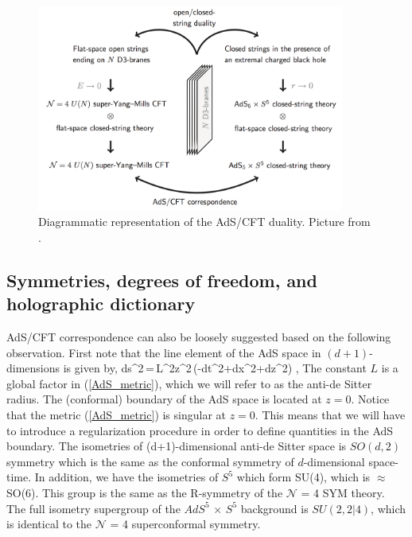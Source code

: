 \begin{figure}[h!]
\label{fig:AdS1} 
  \centering
      \includegraphics[width=0.9\textwidth]{./Figures/ads22.jpg}
  \caption{\label{fig:AdS1}Diagrammatic representation of the AdS/CFT duality. Picture from \cite{ZEA}.}
\end{figure}



\subsection{Symmetries, degrees of freedom, and holographic dictionary} 

AdS/CFT correspondence can also be loosely suggested based on the following observation. First note that 
the line element of the AdS space  in $(d+1)$-dimensions is given by,
\beq
ds^2\,=\,{L^2\over z^2}\,(-dt^2+d\vec x^2+dz^2)\,\,,
\label{AdS_metric}
\eeq
The constant $L$ is a global factor in (\ref{AdS_metric}), which we will refer 
to as the anti-de Sitter radius. 
The (conformal) boundary of the AdS space is located at $z=0$. Notice that the metric (\ref{AdS_metric}) is singular at $z=0$.
This means that we will have to introduce a regularization procedure in order to define quantities in the AdS boundary.
The isometries of (d+1)-dimensional anti-de Sitter space is $SO(d,2)$ symmetry which is the same 
as the conformal symmetry of $d$-dimensional space-time. In addition, we have the isometries of $S^{5}$ 
which form SU(4), which is $\approx$ SO(6). This group is the same as the R-symmetry of the $\mathcal{N}$ = 4 SYM theory. 
The full isometry supergroup of the $AdS^{5}$ $\times$ $S^{5}$ background is $SU(2, 2|4)$, 
which is identical to the $\mathcal{N}$ = 4 superconformal symmetry.

